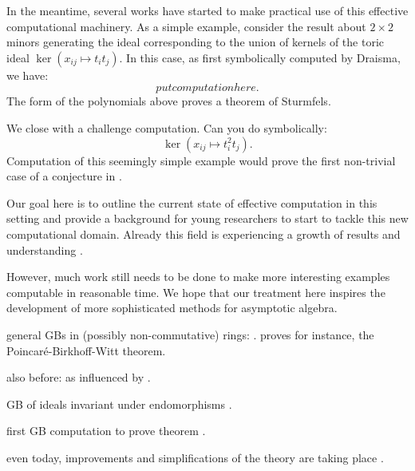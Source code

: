 In the meantime, several works have started to make practical use of this effective computational machinery.  As a simple example, consider the result about $2 \times 2$ minors generating the ideal corresponding to the union of kernels of the toric ideal $\ker{(x_{ij} \mapsto t_i t_j)}$.  In this case, as first symbolically computed by Draisma, we have:
\[ put computation here.\]
The form of the polynomials above proves a theorem of Sturmfels.

We close with a challenge computation.  Can you do symbolically:
\[ \ker{(x_{ij} \mapsto t_i^2 t_j)}.\]
Computation of this seemingly simple example would prove the first non-trivial case of a conjecture in \cite{aschenbrenner2007finite}.

Our goal here is to outline the current state of effective computation in this setting and provide a background for young researchers to start to tackle this new computational domain.  Already this field is experiencing a growth of results and understanding \cite{Nagel, krone2016hilbert}.

However, much work still needs to be done to make more interesting examples computable in reasonable time.  We hope that our treatment here inspires the development of more sophisticated methods for asymptotic algebra.


\cite{kemer2008analog}


general GBs in (possibly non-commutative) rings:  \cite{bergman1978diamond}.  proves for instance, the Poincar\'e-Birkhoff-Witt theorem.

also before: \cite{bokut1976embeddings} as influenced by \cite{shirshov1962some}.

GB of ideals invariant under endomorphisms \cite{drensky2006grobner, la2009letterplace}.

first GB computation to prove theorem \cite{Brouwer09e}.




even today, improvements and simplifications of the theory are taking place \cite{schauenburg2007grobner}.